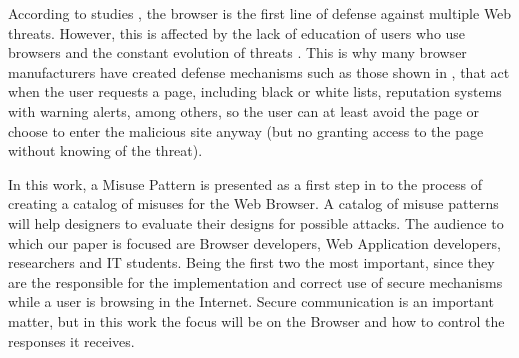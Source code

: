 \documentclass{sig-alternate-05-2015}
\begin{document}
According to studies \cite{browSecPhish,Labs2013,rowSecSEMBlock}, the browser is the first line of defense against multiple Web threats. However, this is affected by the lack of education of users who use browsers and the constant evolution of threats \cite{browSecPhish}. This is why many browser manufacturers have created defense mechanisms such as those shown in \cite{Drake2011}, that act when the user requests a page, including black or white lists, reputation systems \cite{Rajab2013} with warning alerts, among others, so the user can at least avoid the page or choose to enter the malicious site anyway (but no granting access to the page without knowing of the threat).

In this work, a Misuse Pattern is presented as a first step in to the process of creating a catalog of misuses for the Web Browser. A catalog of misuse patterns will help designers to evaluate their designs for possible attacks. The audience to which our paper is focused are Browser developers, Web Application developers, researchers and IT students. Being the first two the most important, since they are the responsible for the implementation and correct use of secure mechanisms while a user is browsing in the Internet. Secure communication is an important matter, but in this work the focus will be on the Browser and how to control the responses it receives.
\end{document}
